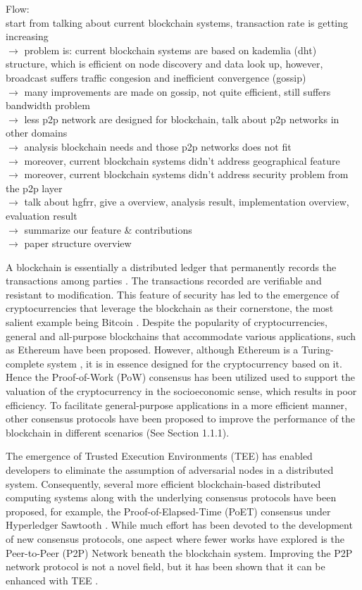 Flow: \\
start from talking about current blockchain systems, transaction rate is getting increasing \\
$\rightarrow$
problem is: current blockchain systems are based on kademlia (dht) structure, which is efficient on node discovery and data look up, however, broadcast suffers traffic congesion and inefficient convergence (gossip)\\
$\rightarrow$
many improvements are made on gossip, not quite efficient, still suffers bandwidth problem\\
$\rightarrow$
less p2p network are designed for blockchain, talk about p2p networks in other domains\\
$\rightarrow$
analysis blockchain needs and those p2p networks does not fit\\
$\rightarrow$
moreover, current blockchain systems didn't address geographical feature\\
$\rightarrow$
moreover, current blockchain systems didn't address security problem from the p2p layer\\
$\rightarrow$
talk about hgfrr, give a overview, analysis result, implementation overview, evaluation result\\
$\rightarrow$
summarize our feature \& contributions\\
$\rightarrow$
paper structure overview

A blockchain is essentially a distributed ledger that permanently records the transactions among parties \cite{iansiti2018truth}. The transactions recorded are verifiable and resistant to modification. This feature of security has led to the emergence of cryptocurrencies that leverage the blockchain as their cornerstone, the most salient example being Bitcoin \cite{nakamoto2008bitcoin}. Despite the popularity of cryptocurrencies, general and all-purpose blockchains that accommodate various applications, such as Ethereum \cite{wood2014ethereum} have been proposed. However, although Ethereum is a Turing-complete system \cite{wood2014ethereum}, it is in essence designed for the cryptocurrency based on it. Hence the Proof-of-Work (PoW) consensus has been utilized used to support the valuation of the cryptocurrency in the socioeconomic sense, which results in poor efficiency. To facilitate general-purpose applications in a more efficient manner, other consensus protocols have been proposed to improve the performance of the blockchain in different scenarios (See Section 1.1.1).  

The emergence of Trusted Execution Environments (TEE) has enabled developers to eliminate the assumption of adversarial nodes in a distributed system. Consequently, several more efficient blockchain-based distributed computing systems along with the underlying consensus protocols have been proposed, for example, the Proof-of-Elapsed-Time (PoET) consensus under Hyperledger Sawtooth \cite{sawtooth}. While much effort has been devoted to the development of new consensus protocols, one aspect where fewer works have explored is the Peer-to-Peer (P2P) Network beneath the blockchain system. Improving the P2P network protocol is not a novel field, but it has been shown that it can be enhanced with TEE \cite{jia2017robust}. 

